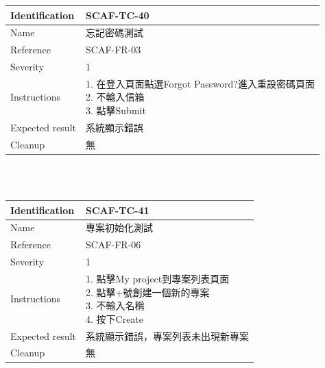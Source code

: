 \documentclass{report}
\begin{document}
\begin{tabularx}{\textwidth}{
  |p{}%
  |p{}|%
  }
  \hline
  \centering Identification &  SCAF-TC-40 \\
  \hline
  \centering Name & 忘記密碼測試 \\
  \hline
  \centering Reference & SCAF-FR-03 \\
  \hline
  \centering Severity & 1 \\
  \hline
  \centering Instructions & 
  \makecell[l]{
    1. 在登入頁面點選Forgot Password?進入重設密碼頁面 \\
    2. 不輸入信箱  \\
    3. 點擊Submit \\
  }\\
  \hline
  \centering Expected result & 系統顯示錯誤 \\
  \hline
  \centering Cleanup & 無 \\
  \hline
\end{tabularx}
\\
\newline
\\
\begin{tabularx}{\textwidth}{
  |p{}%
  |p{}|%
  }
  \hline
  \centering Identification &  SCAF-TC-41 \\
  \hline
  \centering Name & 專案初始化測試 \\
  \hline
  \centering Reference & SCAF-FR-06 \\
  \hline
  \centering Severity & 1 \\
  \hline
  \centering Instructions & 
  \makecell[l]{
    1. 點擊My project到專案列表頁面  \\
    2. 點擊+號創建一個新的專案  \\
    3. 不輸入名稱  \\
    4. 按下Create
  }\\
  \hline
  \centering Expected result & 系統顯示錯誤，專案列表未出現新專案 \\
  \hline
  \centering Cleanup & 無 \\
  \hline
\end{tabularx}
\\
\newline
\\
\end{document}
